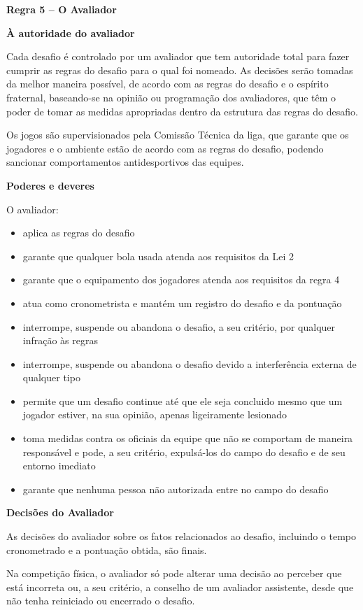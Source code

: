 \clearpage
\sffamily
{\bfseries\color[rgb]{0.4,0.4,0.4}
Regra 5 – O Avaliador}
{}

\bigskip

{\bfseries À autoridade do avaliador}

\headlinebox

Cada desafio é controlado por um avaliador que tem autoridade total para fazer cumprir as regras do desafio para o qual foi nomeado. As decisões serão tomadas da melhor maneira possível, de acordo com as regras do desafio e o espírito fraternal, baseando-se na opinião ou programação dos avaliadores, que têm o poder de tomar as medidas apropriadas dentro da estrutura das regras do desafio.

Os jogos são supervisionados pela Comissão Técnica da liga, que garante que os jogadores e o ambiente estão de acordo com as regras do desafio, podendo sancionar comportamentos antidesportivos das equipes.

\bigskip

{\bfseries Poderes e deveres}

\headlinebox

O avaliador:

\begin{itemize}
    \item aplica as regras do desafio
    \item garante que qualquer bola usada atenda aos requisitos da Lei 2
    \item garante que o equipamento dos jogadores atenda aos requisitos da regra 4
    \item atua como cronometrista e mantém um registro do desafio e da pontuação
    \item interrompe, suspende ou abandona o desafio, a seu critério, por qualquer infração às regras
    \item interrompe, suspende ou abandona o desafio devido a interferência externa de qualquer tipo
    \item permite que um desafio continue até que ele seja concluido mesmo que um jogador estiver, na sua opinião, apenas ligeiramente lesionado
    \item toma medidas contra os oficiais da equipe que não se comportam de maneira responsável e pode, a seu critério, expulsá-los do campo do desafio e de seu entorno imediato
    \item garante que nenhuma pessoa não autorizada entre no campo do desafio
\end{itemize}

\bigskip

{\bfseries Decisões do Avaliador}

\headlinebox

As decisões do avaliador sobre os fatos relacionados ao desafio, incluindo o tempo cronometrado e a pontuação obtida, são finais. 

\bigskip

Na competição física, o avaliador só pode alterar uma decisão ao perceber que está incorreta ou, a seu critério, a conselho de um avaliador assistente, desde que não tenha reiniciado ou encerrado o desafio.